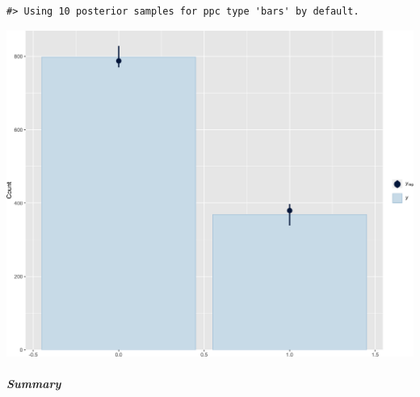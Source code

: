 \documentclass[
]{article}
\begin{document}
\begin{verbatim}
#> Using 10 posterior samples for ppc type 'bars' by default.
\end{verbatim}

\begin{center}\includegraphics[width=1\linewidth]{notebook_files/figure-latex/model1full_ppcheck-1} \end{center}

\hypertarget{summary}{%
\subparagraph{Summary}\label{summary}}
\end{document}
